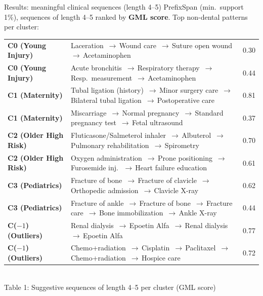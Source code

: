 \documentclass[aspectratio=169,11pt]{beamer}
\newcommand{\kw}[1]{{\color{hospaccent}\bfseries #1}}
\newcommand{\seqarrow}{\,{\color{hospaccent}\boldmath$\rightarrow$}\,}
\begin{document}
\begin{frame}{Results: meaningful clinical sequences (length 4--5)}
  \vspace{-0.15em}
  {\small PrefixSpan (min.\ support 1\%), sequences of length 4--5 ranked by \kw{GML score}. Top non-dental patterns per cluster:}
  \vspace{0.2em}
  \centering
  \tiny
  \renewcommand{\arraystretch}{1.22}
  \begin{tabular}{@{}>{\bfseries}p{2.4cm} >{\raggedright\arraybackslash}p{9.2cm} c@{}}
    \toprule
    \rowcolor{hosplight}
    C0 (Young Injury) & Laceration \seqarrow Wound care \seqarrow Suture open wound \seqarrow Acetaminophen & 0.30 \\
    \rowcolor{hosplight}
    C0 (Young Injury) & Acute bronchitis \seqarrow Respiratory therapy \seqarrow Resp.\ measurement \seqarrow Acetaminophen & 0.44 \\
    \midrule
    C1 (Maternity) & Tubal ligation (history) \seqarrow Minor surgery care \seqarrow Bilateral tubal ligation \seqarrow Postoperative care & 0.81 \\
    C1 (Maternity) & Miscarriage \seqarrow Normal pregnancy \seqarrow Standard pregnancy test \seqarrow Fetal ultrasound & 0.37 \\
    \midrule
    \rowcolor{hosplight}
    C2 (Older High Risk) & Fluticasone/Salmeterol inhaler \seqarrow Albuterol \seqarrow Pulmonary rehabilitation \seqarrow Spirometry & 0.70 \\
    \rowcolor{hosplight}
    C2 (Older High Risk) & Oxygen administration \seqarrow Prone positioning \seqarrow Furosemide inj.\ \seqarrow Heart failure education & 0.61 \\
    \midrule
    C3 (Pediatrics) & Fracture of bone \seqarrow Fracture of clavicle \seqarrow Orthopedic admission \seqarrow Clavicle X-ray & 0.62 \\
    C3 (Pediatrics) & Fracture of ankle \seqarrow Fracture of bone \seqarrow Fracture care \seqarrow Bone immobilization \seqarrow Ankle X-ray & 0.44 \\
    \midrule
    \rowcolor{hosplight}
    C($-1$) (Outliers) & Renal dialysis \seqarrow Epoetin Alfa \seqarrow Renal dialysis \seqarrow Epoetin Alfa & 0.77 \\
    \rowcolor{hosplight}
    C($-1$) (Outliers) & Chemo+radiation \seqarrow Cisplatin \seqarrow Paclitaxel \seqarrow Chemo+radiation \seqarrow Hospice care & 0.72 \\
    \bottomrule
  \end{tabular}\\[4pt]
  {\scriptsize\color{hospgray} Table 1: Suggestive sequences of length 4--5 per cluster (GML score)}
\end{frame}
\end{document}
